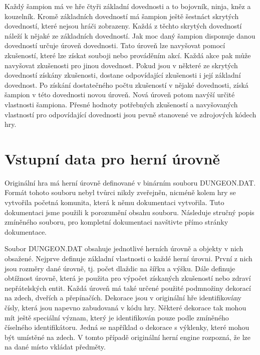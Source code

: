 Každý šampion má ve hře čtyři základní dovednosti a to bojovník, ninja, kněz a kouzelník.
Kromě základních dovedností má šampion ještě šestnáct skrytých dovedností, které nejsou hráči zobrazeny.
Každá z těchto skrytých dovedností náleží k nějaké ze základních dovedností.
Jak moc daný šampion disponuje danou dovedností určuje úroveň dovednosti. 
Tato úroveň lze navyšovat pomocí zkušeností, které lze získat souboji nebo prováděním akcí. Každá
akce pak může navyšovat zkušenosti pro jinou dovednost. Pokud jsou v některé ze skrytých dovedností 
získány zkušenosti, dostane odpovídající zkušenosti i její základní dovednost. Po získání dostatečného
počtu zkušeností v nějaké dovednosti, získá šampion v této dovednosti novou úroveň. Nová úroveň potom
navýší určité vlastnosti šampiona. Přesné hodnoty potřebných zkušeností a navyšovaných vlastností pro 
odpovídající dovednosti jsou pevně stanovené ve zdrojových kódech hry.

\section{Vstupní data pro herní úrovně}\label{dungeon-objects}

Originální hra má herní úrovně definované v binárním souboru DUNGEON.DAT. Formát tohoto souboru nebyl tvůrci nikdy zveřejněn,
nicméně kolem hry se vytvořila početná komunita, která k němu dokumentaci\cite{TechnicalDocumentationFontanel05} vytvořila.
Tuto dokumentaci jsme použili k porozumění obsahu souboru. Následuje stručný popis zmíněného souboru, pro 
kompletní dokumentaci navštivte přímo stránky dokumentace.

Soubor DUNGEON.DAT obsahuje jednotlivé herních úrovně a objekty v nich obsažené. Nejprve definuje základní 
vlastnosti o každé herní úrovni. První z nich jsou rozměry dané úrovně, tj. počet dlaždic na šířku a výšku. Dále
definuje obtížnost úrovně, která je použita pro výpočet získaných zkušeností nebo zdraví nepřátelských entit. Každá úroveň má
také určené použité podmnožiny dekorací na zdech, dveřích a přepínačích. Dekorace jsou v originální hře identifikovány čísly, která
jsou napevno zabudovaná v kódu hry. Některé dekorace tak mohou mít ještě speciální význam, který je identifikován
pouze podle zmíněného číselného identifikátoru. Jedná se například o dekorace s výklenky, které mohou být umístěné na zdech.
V tomto případě originální herní engine rozpozná, že lze na dané místo vkládat předměty.

